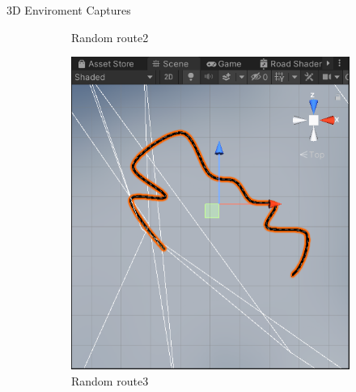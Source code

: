 \documentclass[final]{beamer}
\newlength{\twocolwid}
\begin{document}
\begin{frame}[t]
\begin{columns}[t]
\begin{column}{\twocolwid}
\begin{alertblock}{3D Enviroment Captures}
\begin{figure}
\begin{subfigure}[bH]{0.15\textwidth}
        \caption{Random route2}
        \label{fig:rr2}
    \end{subfigure}
    \hfill
    \begin{subfigure}[bH]{0.15\textwidth}
        \includegraphics[width=\textwidth]{road3.PNG}
        \caption{Random route3}
        \label{fig:rr3}
    \end{subfigure}
    \hfill
    \begin{subfigure}[bH]{0.15\textwidth}

\end{subfigure}
\end{figure}
\end{alertblock}
\end{column}
\end{columns}
\end{frame}
\end{document}
